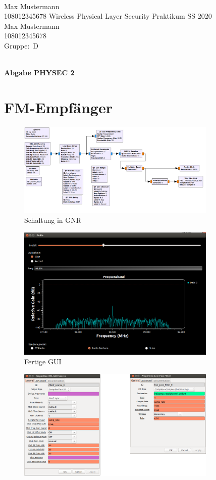 \documentclass[12pt,a4paper]{article}
\newcommand{\student}{Max Mustermann\\ 108012345678 } %
\newcommand{\partner}{Max Mustermann\\ 108012345678} %
\newcommand{\thirdone}{Max Mustermann\\ 108012345678}
\newcommand{\group}{D} %
\newcommand{\hwheadtwo}{$ $
  \vspace{-2cm}
  
\noindent \student \qquad \qquad  Wireless Physical Layer Security Praktikum \hfill SS 2020 \\
\noindent \partner \\
\noindent Gruppe:~\group\\
$ $

  
\begin{center}    
{\Large \bf Abgabe PHYSEC 2}
\end{center}
}
\begin{document}
\hwheadtwo

\section{FM-Empfänger}



 
\begin{figure}[hbt!]
\centering
	\includegraphics[width=0.85\textwidth ]{Bilder/Aufgabe1-gesamt-grc.png}
	\caption{Schaltung in GNR}
	\label{fig:Label1}
\end{figure}



\begin{figure}[hbt!]
\centering
	\includegraphics[width=0.85\textwidth ]{Bilder/Aufgabe1-gui.png}
	\caption{Fertige GUI}
	\label{fig:Label2}
\end{figure}


\begin{figure}[hbt!]
\centering
	\includegraphics[width=0.85\textwidth ]{Bilder/Aufgabe1-properties1.png}
\end{figure}
\end{document}

